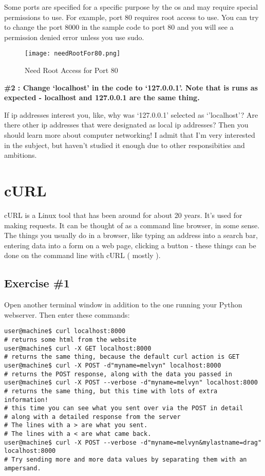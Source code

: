\documentclass[10pt]{article}
\begin{document}
Some ports are specified for a specific purpose by the os and may require special permissions to use. For example, port 80 requires root access to use. You can try to change the port 8000 in the sample code to port 80 and you will see a permission denied error unless you use sudo.

\begin{figure}[h]
  \centering
    \texttt{[image: needRootFor80.png]}
  \caption{Need Root Access for Port 80}
\end{figure}


\begin{center}
\textbf{\#2 : Change `localhost' in the code to `127.0.0.1'. Note that is runs as expected - localhost and 127.0.0.1 are the same thing.}
\end{center}

If ip addresses interest you, like, why was `127.0.0.1' selected as `'localhost'? Are there other ip addresses that were designated as local ip addresses? Then you should learn more about computer networking! I admit that I'm very interested in the subject, but haven't studied it enough due to other responsibities and ambitions.

\section{cURL}
cURL is a Linux tool that has been around for about 20 years. It's used for making requests. It can be thought of as a command line browser, in some sense. The things you usually do  in a browser, like typing an address into a search bar, entering data into a form on a web page, clicking a button - these things can be done on the command line with cURL ( mostly ).

\subsection{Exercise \#1}
Open another terminal window in addition to the one running your Python webserver. Then enter these commands:

\begin{lstlisting}
user@machine$ curl localhost:8000
# returns some html from the website
user@machine$ curl -X GET localhost:8000
# returns the same thing, because the default curl action is GET
user@machine$ curl -X POST -d"myname=melvyn" localhost:8000
# returns the POST response, along with the data you passed in
user@machine$ curl -X POST --verbose -d"myname=melvyn" localhost:8000
# returns the same thing, but this time with lots of extra information!
# this time you can see what you sent over via the POST in detail
# along with a detailed response from the server
# The lines with a > are what you sent.
# The lines with a < are what came back.
user@machine$ curl -X POST --verbose -d"myname=melvyn&mylastname=drag" localhost:8000
# Try sending more and more data values by separating them with an ampersand.
\end{lstlisting}
\end{document}
